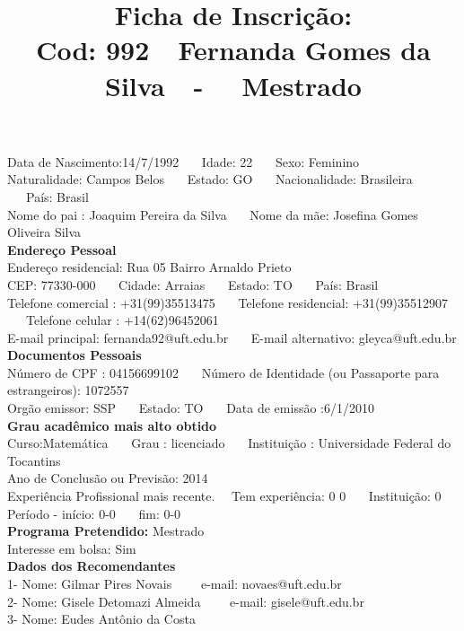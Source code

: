 \documentclass[11pt]{article}
\title{\vspace*{-4cm} Ficha de Inscrição: \\Cod: 992\ \ Fernanda Gomes da Silva\ \ - \ \ Mestrado 
 }
\date{}
\begin{document}
\maketitle
\vspace*{-1.5cm}
\noindent Data de Nascimento:14/7/1992
\ \ \ Idade: 22   \ \ \ Sexo: Feminino
\\
Naturalidade: Campos Belos  
\ \ \  Estado: GO
\ \ \  Nacionalidade: Brasileira
\ \ \ País: Brasil
\\        
Nome do pai : Joaquim Pereira da Silva
\ \ \ Nome da mãe: Josefina Gomes Oliveira Silva          
\\[0.2cm]                     
\textbf{Endereço Pessoal} 
\\ 
\noindent Endereço residencial: Rua 05 Bairro Arnaldo Prieto
\\
        CEP: 77330-000 
\ \ \ Cidade: Arraias 
\ \ \ Estado: TO 
\ \ \ País: Brasil
\\		
		Telefone comercial : +31(99)35513475
\ \ \ Telefone residencial: +31(99)35512907
\ \ \ Telefone celular : +14(62)96452061
\\
E-mail principal: fernanda92@uft.edu.br
\ \ \ E-mail alternativo: gleyca@uft.edu.br 
\\[0.2cm] 
\textbf{Documentos Pessoais}
\\
\noindent Número de CPF : 04156699102
\ \ \ Número de Identidade (ou Passaporte para estrangeiros): 1072557
\\
Orgão emissor: SSP
\ \ \ Estado: TO
\ \ \ Data de emissão :6/1/2010
\\[0.3cm]
\textbf{Grau acadêmico mais alto obtido}
\\	
Curso:Matemática
\ \ \ Grau : licenciado
\ \ \ Instituição : Universidade Federal do Tocantins
\\			
Ano de Conclusão ou Previsão: 2014
\\ 
Experiência Profissional mais recente. \ \  
Tem experiência: 0 0  
\ \ \ Instituição: 0
\\  
Período - início: 0-0
\ \ \ fim: 0-0
\\[0.2cm] 
\textbf{Programa Pretendido:} Mestrado\\
Interesse em bolsa: Sim
\\[0.3cm]		
\textbf{Dados dos Recomendantes} 
\\
1- Nome: Gilmar Pires Novais
\ \ \ \  e-mail: novaes@uft.edu.br 
\\
2- Nome: Gisele Detomazi Almeida
\ \ \ \ e-mail: gisele@uft.edu.br
\\
3- Nome: Eudes Antônio da Costa
\end{document}
